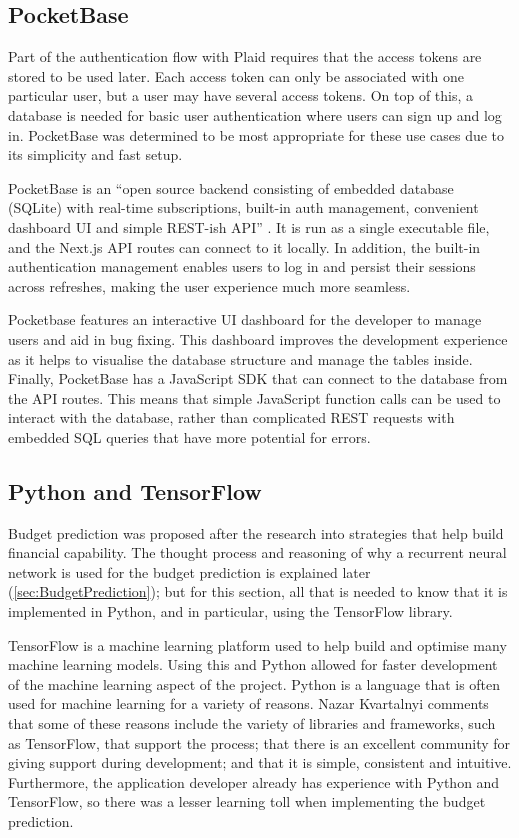 \subsection{PocketBase}
Part of the authentication flow with Plaid requires that the access tokens are stored to be used later. Each access token can only be associated with one particular user, but a user may have several access tokens. On top of this, a database is needed for basic user authentication where users can sign up and log in. PocketBase was determined to be most appropriate for these use cases due to its simplicity and fast setup.

PocketBase is an ``open source backend consisting of embedded database (SQLite) with real-time subscriptions, built-in auth management, convenient dashboard UI and simple REST-ish API'' \cite{PocketBaseDocs}. It is run as a single executable file, and the Next.js API routes can connect to it locally. In addition, the built-in authentication management enables users to log in and persist their sessions across refreshes, making the user experience much more seamless.

Pocketbase features an interactive UI dashboard for the developer to manage users and aid in bug fixing. This dashboard improves the development experience as it helps to visualise the database structure and manage the tables inside. Finally, PocketBase has a JavaScript SDK that can connect to the database from the API routes. This means that simple JavaScript function calls can be used to interact with the database, rather than complicated REST requests with embedded SQL queries that have more potential for errors.

\subsection{Python and TensorFlow}
Budget prediction was proposed after the research into strategies that help build financial capability. The thought process and reasoning of why a recurrent neural network is used for the budget prediction is explained later (\ref{sec:BudgetPrediction}); but for this section, all that is needed to know that it is implemented in Python, and in particular, using the TensorFlow library.

TensorFlow is a machine learning platform used to help build and optimise many machine learning models. Using this and Python allowed for faster development of the machine learning aspect of the project. Python is a language that is often used for machine learning for a variety of reasons. Nazar Kvartalnyi \cite{PythonML} comments that some of these reasons include the variety of libraries and frameworks, such as TensorFlow, that support the process; that there is an excellent community for giving support during development; and that it is simple, consistent and intuitive. Furthermore, the application developer already has experience with Python and TensorFlow, so there was a lesser learning toll when implementing the budget prediction.

